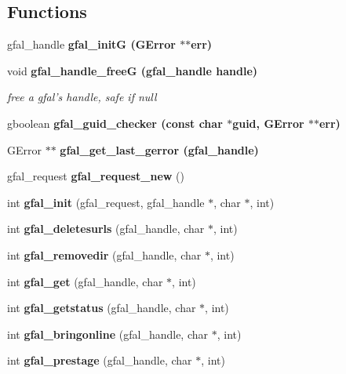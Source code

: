 \subsection*{Functions}
\begin{CompactItemize}
\item 
gfal\_\-handle \bf{gfal\_\-init\-G} (GError $\ast$$\ast$err)
\item 
void \bf{gfal\_\-handle\_\-free\-G} (gfal\_\-handle handle)\label{gfal__common_8h_9dbd943eaed291897d852fc3ae560058}

\begin{CompactList}\small\item\em free a gfal's handle, safe if null \item\end{CompactList}\item 
gboolean \bf{gfal\_\-guid\_\-checker} (const char $\ast$guid, GError $\ast$$\ast$err)
\item 
GError $\ast$$\ast$ \bf{gfal\_\-get\_\-last\_\-gerror} (gfal\_\-handle)
\item 
gfal\_\-request \textbf{gfal\_\-request\_\-new} ()\label{gfal__common_8h_b5d503849656335232e56583b376ee22}

\item 
int \textbf{gfal\_\-init} (gfal\_\-request, gfal\_\-handle $\ast$, char $\ast$, int)\label{gfal__common_8h_6a6a376acadfe02f8b8fdd07d0d19dd1}

\item 
int \textbf{gfal\_\-deletesurls} (gfal\_\-handle, char $\ast$, int)\label{gfal__common_8h_5e5a84f63eaa3bf2bb079e9f2eb26206}

\item 
int \textbf{gfal\_\-removedir} (gfal\_\-handle, char $\ast$, int)\label{gfal__common_8h_0a50e7e9c9f23b0f3272d104ae69daee}

\item 
int \textbf{gfal\_\-get} (gfal\_\-handle, char $\ast$, int)\label{gfal__common_8h_5a11900a104a51b955944379c7397db1}

\item 
int \textbf{gfal\_\-getstatus} (gfal\_\-handle, char $\ast$, int)\label{gfal__common_8h_8fe0e87610c1221796a3d10d2cf4816e}

\item 
int \textbf{gfal\_\-bringonline} (gfal\_\-handle, char $\ast$, int)\label{gfal__common_8h_4eb3771f917c71fee4cc06d925a19322}

\item 
int \textbf{gfal\_\-prestage} (gfal\_\-handle, char $\ast$, int)\label{gfal__common_8h_17c188741a1d8f6db0cfbe22ef2c402f}


\end{CompactItemize}
